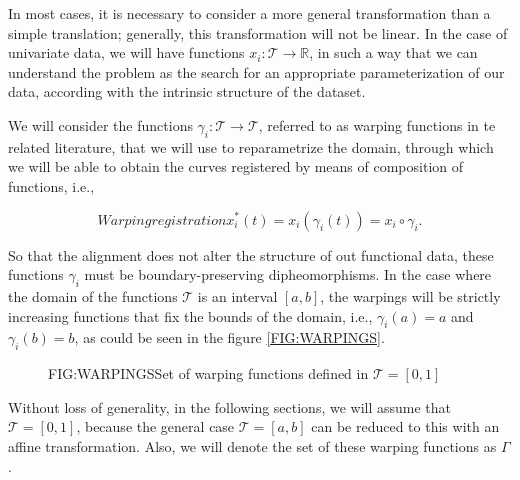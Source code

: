 In most cases, it is necessary to consider a more general transformation than a
simple translation; generally, this transformation will not be linear. In the
case of univariate data, we will have functions
$x_i: \mathcal{T} \rightarrow \mathbb{R}$, in such a way that we can understand
the problem as the search for an appropriate parameterization of our data,
according with the intrinsic structure of the dataset.

We will consider the functions $\gamma_i: \mathcal{T} \rightarrow \mathcal{T}$,
referred to as warping functions in te related literature, that we will use to reparametrize the domain, through which we will be able to
obtain the curves registered by means of composition of functions, i.e.,

\begin{equation}[]{Warping registration}
x_i^*(t)=x_i(\gamma_i(t)) = x_i \circ \gamma _i.
\end{equation}

So that the alignment does not alter the structure of out functional data,
these functions $\gamma_i$ must be boundary-preserving dipheomorphisms. In the
case where the domain of the functions $\mathcal{T}$ is an interval $[a,b]$, the
warpings will be strictly increasing functions that fix the bounds of the
domain, i.e., $\gamma_i(a)=a$ and $\gamma_i(b)=b$, as could be seen in the
figure \ref{FIG:WARPINGS}.

\begin{figure}[Set of warping functions]{FIG:WARPINGS}{Set of warping functions defined in $\mathcal{T}=[0,1]$}
\end{figure}


Without loss of generality, in the following sections, we
will assume that $\mathcal{T}=[0,1]$, because the general case
$\mathcal{T}=[a,b]$ can be reduced to this with an affine transformation. Also,
we will denote the set of these warping functions as $\Gamma$.
